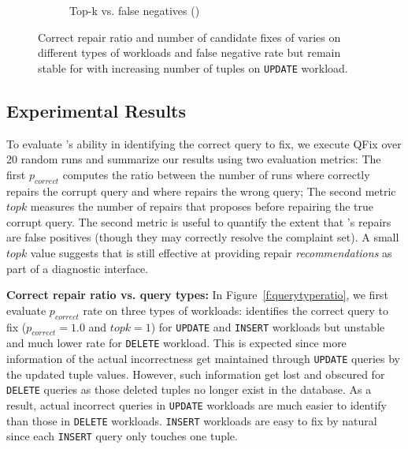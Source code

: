 \begin{figure}[t]
\begin{subfigure} [t]{.3\textwidth}
    \vspace*{-.25in}
    \caption{Top-k vs. false negatives (\color{red}{not complete!})}
    \vspace*{-.1in}
    \label{f:fnfixcount} 
    \end{subfigure}
   \caption{Correct repair ratio and number of candidate fixes of \sys varies on different types of workloads and false negative rate but remain 
   stable for with increasing number of tuples on \texttt{UPDATE} workload.}
   \vspace*{-.1in}
   \label{fig:truerate}
  \end{figure}


\subsection{Experimental Results}
To evaluate \sys's ability in identifying the correct query to fix, we execute QFix over 20 random runs and summarize our results using two evaluation metrics:
The first $p_{correct}$ computes the ratio between the number of runs where \sys correctly repairs the corrupt query and where \sys
repairs the wrong query; The second metric $topk$ measures the number of repairs that \sys proposes before repairing the true corrupt query.
The second metric is useful to quantify the extent that \sys's repairs are false positives (though they may correctly resolve the complaint set).
A small $topk$ value suggests that \sys is still effective at providing repair \emph{recommendations} as part of a diagnostic interface.

\textbf{Correct repair ratio vs. query types: } In Figure~\ref{f:querytyperatio}, we first evaluate $p_{correct}$ rate on three types of workloads: \sys identifies the correct query to fix ($p_{correct} = 1.0$ and $topk = 1$) for \texttt{UPDATE} and \texttt{INSERT} workloads but unstable and much lower rate for \texttt{DELETE} workload. This is expected since more information of the actual incorrectness get maintained through \texttt{UPDATE} queries by the updated tuple values.  However, such information get lost and obscured for \texttt{DELETE} queries as those deleted tuples no longer exist in the database. As a result, actual incorrect queries in \texttt{UPDATE} workloads are much easier to identify than those in \texttt{DELETE} workloads. \texttt{INSERT} workloads are easy to fix by natural since each \texttt{INSERT} query only touches one tuple. 


